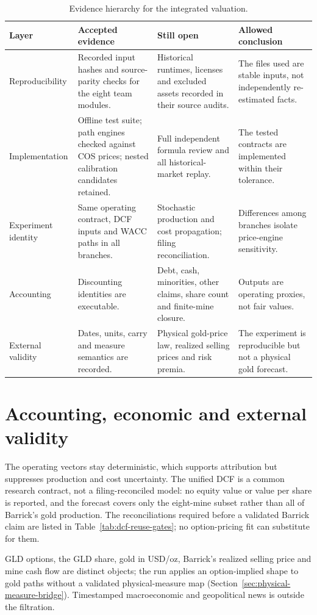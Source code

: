 \begin{table}[H]
\centering
\caption{Evidence hierarchy for the integrated valuation.}
\label{tab:validation-evidence-hierarchy}
\scriptsize
\setlength{\tabcolsep}{3pt}
\renewcommand{\arraystretch}{1.10}
\begin{tabularx}{\textwidth}{@{}p{2.20cm}X X X@{}}
\toprule
Layer & Accepted evidence & Still open & Allowed conclusion \\
\midrule
Reproducibility & Recorded input hashes and source-parity checks for the eight
team modules. &
Historical runtimes, licenses and excluded assets recorded in their source
audits. & The files used are stable inputs, not independently re-estimated
facts. \\
Implementation & Offline test suite; path engines checked against COS prices;
nested calibration candidates retained. & Full independent formula review and
all historical-market replay. & The tested contracts are implemented within
their tolerance. \\
Experiment identity & Same operating contract, DCF inputs and WACC paths in all
branches. & Stochastic production and cost propagation; filing reconciliation.
& Differences among branches isolate price-engine sensitivity. \\
Accounting & Discounting identities are executable. & Debt, cash, minorities,
other claims, share count and finite-mine closure. & Outputs are operating
proxies, not fair values. \\
External validity & Dates, units, carry and measure semantics are recorded. &
Physical gold-price law, realized selling prices and risk premia. & The
experiment is reproducible but not a physical gold forecast. \\
\bottomrule
\end{tabularx}
\end{table}

\section{Accounting, economic and external validity}

The operating vectors stay deterministic, which supports attribution but
suppresses production and cost uncertainty. The unified DCF is a common
research contract, not a filing-reconciled model: no equity value or value per
share is reported, and the forecast covers only the eight-mine subset rather
than all of Barrick's gold production. The reconciliations required before a
validated Barrick claim are listed in Table~\ref{tab:dcf-reuse-gates}; no
option-pricing fit can substitute for them.

GLD options, the GLD share, gold in USD/oz, Barrick's realized selling price
and mine cash flow are distinct objects; the run applies an option-implied
shape to gold paths without a validated physical-measure map
(Section~\ref{sec:physical-measure-bridge}). Timestamped macroeconomic and
geopolitical news is outside the filtration.
